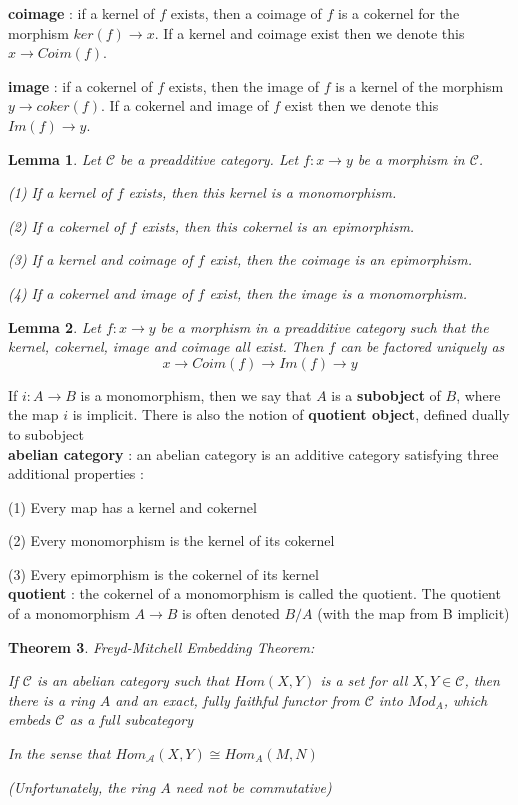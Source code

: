 \documentclass{article}
\newtheorem{theorem}{Theorem}[section]
\newtheorem{lemma}[theorem]{Lemma}
\begin{document}
\textbf{coimage} : if a kernel of $f$ exists, then a coimage of $f$ is a cokernel for the morphism $ker(f)\rightarrow x$. If a kernel and coimage exist then we denote this $x\rightarrow Coim(f)$.

\textbf{image} : if a cokernel of $f$ exists, then the image of $f$ is a kernel of the morphism $y\rightarrow coker(f)$. If a cokernel and image of $f$ exist then we denote this $Im(f)\rightarrow y$.
\begin{lemma}
    Let $\mathscr C$ be a preadditive category. Let $f:x\rightarrow y$ be a morphism in $\mathscr C$.

(1) If a kernel of $f$ exists, then this kernel is a monomorphism.

(2) If a cokernel of $f$ exists, then this cokernel is an epimorphism.

(3) If a kernel and coimage of $f$ exist, then the coimage is an epimorphism.

(4) If a cokernel and image of $f$ exist, then the image is a monomorphism.
\end{lemma}
\begin{lemma}
    Let $f:x\rightarrow y$ be a morphism in a preadditive category such that the kernel, cokernel, image and coimage all exist. Then $f$ can be factored uniquely as $$
    x\rightarrow Coim(f)\rightarrow Im(f)\rightarrow y
    $$
\end{lemma}

If $i: A \rightarrow B$ is a monomorphism, then we say that $A$ is a \textbf{subobject} of $B$, where the map $i$ is implicit. There is also the notion of \textbf{quotient object}, defined dually to subobject
\\

\textbf{abelian category} : an abelian category is an additive category satisfying three additional properties :

(1) Every map has a kernel and cokernel

(2) Every monomorphism is the kernel of its cokernel

(3) Every epimorphism is the cokernel of its kernel
\\

\textbf{quotient} : the cokernel of a monomorphism is called the quotient. The quotient of a
monomorphism $A \rightarrow B$ is often denoted $B/A$ (with the map from B implicit)
\begin{theorem}
Freyd-Mitchell Embedding Theorem: 

If $\mathscr C$ is an abelian category such that $Hom(X, Y)$ is a set for all $X, Y \in\mathscr C$, then there is a ring $A$ and an exact, fully faithful
functor from $\mathscr C$ into $Mod_A$, which embeds $\mathscr C$ as a full subcategory

In the sense that $Hom_\mathscr A(X, Y) \cong Hom_A(M, N)$

(Unfortunately, the ring $A$ need not be commutative)
\end{theorem}
\end{document}
